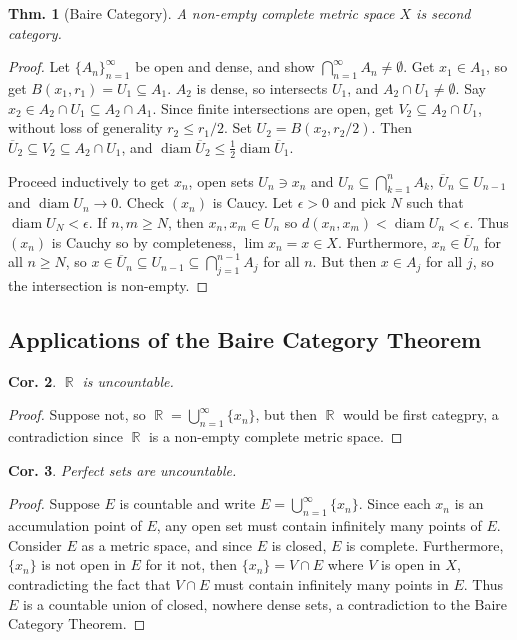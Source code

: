\documentclass[12pt, a4paper]{book}
\DeclareMathOperator{\R}{\mathbb{R}}
\DeclareMathOperator{\diam}{diam}
\newtheorem{theorem}{Thm.}[section]
\newtheorem{corollary}[theorem]{Cor.}
\theoremstyle{nonumberplain}
\newtheorem{proof}{Proof}
\begin{document}
\begin{theorem}[Baire Category]
    A non-empty complete metric space $X$ is second category.
\end{theorem}
\begin{proof}
    Let $\{A_n\}_{n=1}^\infty$ be open and dense, and show $\bigcap_{n=1}^\infty A_n\neq\emptyset$.
    Get $x_1\in A_1$, so get $B(x_1,r_1)=U_1\subseteq A_1$.
    $A_2$ is dense, so intersects $U_1$, and $A_2\cap U_1\neq\emptyset$.
    Say $x_2\in A_2\cap U_1\subseteq A_2\cap A_1$.
    Since finite intersections are open, get $V_2\subseteq A_2\cap U_1$, without loss of generality $r_2\leq r_1/2$.
    Set $U_2=B(x_2,r_2/2)$.
    Then $\overline{U}_2\subseteq V_2\subseteq A_2\cap U_1$, and $\diam\overline{U}_2\leq\frac{1}{2}\diam\overline{U}_1$.

    Proceed inductively to get $x_n$, open sets $U_n\ni x_n$ and $U_n\subseteq\bigcap_{k=1}^n A_k$, $\overline{U}_n\subseteq U_{n-1}$ and $\diam U_n\to 0$.
    Check $(x_n)$ is Caucy.
    Let $\epsilon>0$ and pick $N$ such that $\diam U_N<\epsilon$.
    If $n,m\geq N$, then $x_n,x_m\in U_n$ so $d(x_n,x_m)<\diam U_n<\epsilon$.
    Thus $(x_n)$ is Cauchy so by completeness, $\lim x_n=x\in X$.
    Furthermore, $x_n\in\overline{U}_n$ for all $n\geq N$, so $x\in\overline{U}_n\subseteq U_{n-1}\subseteq\bigcap_{j=1}^{n-1}A_j$ for all $n$.
    But then $x\in A_j$ for all $j$, so the intersection is non-empty.
\end{proof}
\subsection{Applications of the Baire Category Theorem}
\begin{corollary}
    $\R$ is uncountable.
\end{corollary}
\begin{proof}
    Suppose not, so $\R=\bigcup\limits_{n=1}^\infty\{x_n\}$, but then $\R$ would be first categpry, a contradiction since $\R$ is a non-empty complete metric space.
\end{proof}
\begin{corollary}
    Perfect sets are uncountable.
\end{corollary}
\begin{proof}
    Suppose $E$ is countable and write $E=\bigcup\limits_{n=1}^\infty\{x_n\}$.
    Since each $x_n$ is an accumulation point of $E$, any open set must contain infinitely many points of $E$.
    Consider $E$ as a metric space, and since $E$ is closed, $E$ is complete.
    Furthermore, $\{x_n\}$ is not open in $E$ for it not, then $\{x_n\}=V\cap E$ where $V$ is open in $X$, contradicting the fact that $V\cap E$ must contain infinitely many points in $E$.
    Thus $E$ is a countable union of closed, nowhere dense sets, a contradiction to the Baire Category Theorem.
\end{proof}
\end{document}

